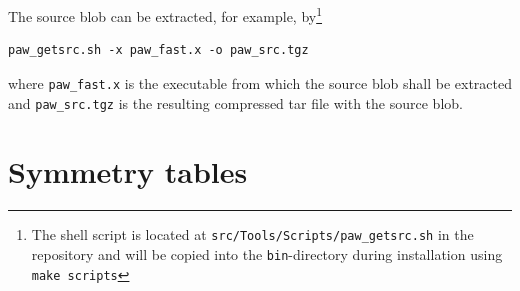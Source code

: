 \documentclass[final,12pt,makeidx,DIV=calc]{article}
\begin{document}
{{{The source blob can be extracted, for example, by\footnote{The shell
script is located at \texttt{src/Tools/Scripts/paw\_getsrc.sh} in the
repository and will be copied into the \texttt{bin}-directory during
installation using \texttt{make scripts}}
\begin{verbatim}
paw_getsrc.sh -x paw_fast.x -o paw_src.tgz
\end{verbatim}
where \verb|paw_fast.x| is the executable from which the source blob
shall be extracted and \verb|paw_src.tgz| is the resulting compressed
tar file with the source blob.


\newpage
\section{Symmetry tables}\label{section:symmetry_tables}
}}}
\end{document}
